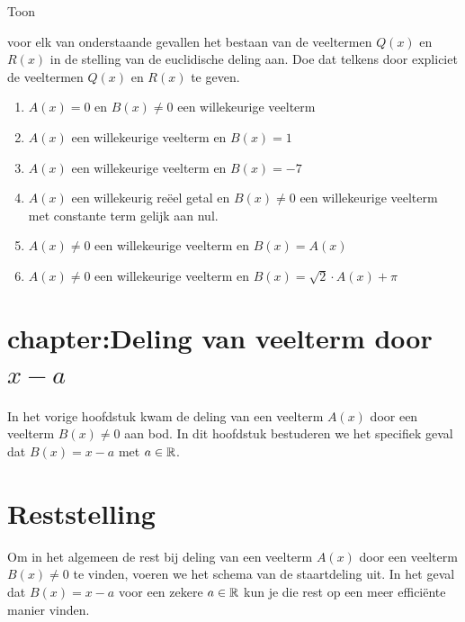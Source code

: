 \documentclass{ximera}
\begin{document}
\begin{exercise} 
\hypertarget{oef2.20}{Toon} voor elk van onderstaande gevallen het bestaan van de veeltermen $Q(x)$ en $R(x)$ in de stelling van de euclidische deling aan. Doe dat telkens door expliciet de veeltermen $Q(x)$ en $R(x)$ te geven. 
\begin{enumerate}
\item
$A(x) = 0$ en $B(x) \neq 0$ een willekeurige veelterm 
\item
$A(x)$ een willekeurige veelterm en $B(x) = 1$
\item
$A(x)$ een willekeurige veelterm en $B(x) = -7$
\item
$A(x)$ een willekeurig re\"eel getal en $B(x) \neq 0$ een willekeurige veelterm met constante term gelijk aan nul.
\item
$A(x) \neq 0$ een willekeurige veelterm en $B(x) = A(x)$
\item
$A(x) \neq 0$ een willekeurige veelterm en $B(x) = \sqrt{2}\cdot A(x)+\pi$
\end{enumerate}
\end{exercise} 

\section{chapter:Deling van veelterm door \texorpdfstring{$x-a$}{x-a}}

In het vorige hoofdstuk kwam de deling van een veelterm $A(x)$ door een veelterm $B(x) \neq 0$ aan bod. In dit hoofdstuk bestuderen we het specifiek geval dat $B(x) = x-a$ met $a \in \mathbb{R}$.

\section{Reststelling}

Om in het algemeen de rest bij deling van een veelterm $A(x)$ door een veelterm $B(x) \neq 0$ te vinden, voeren we het schema van de staartdeling uit. In het geval dat $B(x) = x-a$ voor een zekere $a \in \mathbb{R}$ kun je die rest op een meer effici\"ente manier vinden.
\end{document}
